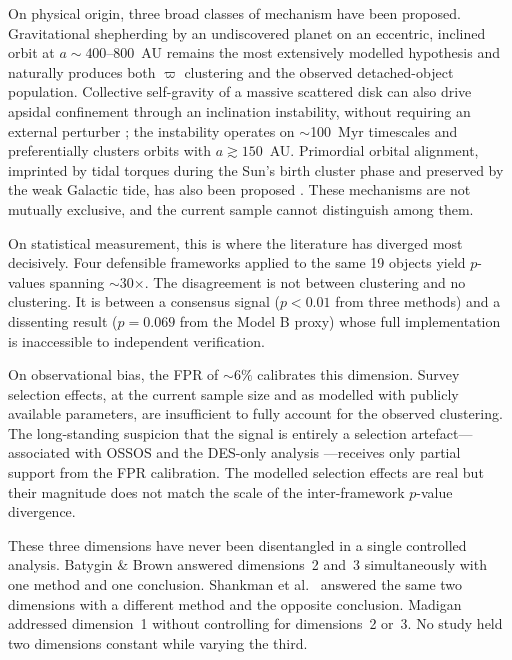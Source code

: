 \documentclass[usenatbib]{mnras}
\begin{document}
On physical origin, three broad classes of mechanism have been proposed. Gravitational shepherding by an undiscovered planet on an eccentric, inclined orbit at $a\sim400$--800~AU \cite{batygin2016,brown2019,batygin2019,siraj2025} remains the most extensively modelled hypothesis and naturally produces both $\varpi$ clustering and the observed detached-object population. Collective self-gravity of a massive scattered disk can also drive apsidal confinement through an inclination instability, without requiring an external perturber \cite{madigan2018,zderic2020}; the instability operates on $\sim$100~Myr timescales and preferentially clusters orbits with $a\gtrsim150$~AU. Primordial orbital alignment, imprinted by tidal torques during the Sun's birth cluster phase and preserved by the weak Galactic tide, has also been proposed \cite{trujillo2014}. These mechanisms are not mutually exclusive, and the current sample cannot distinguish among them.

On statistical measurement, this is where the literature has diverged most decisively. Four defensible frameworks applied to the same 19 objects yield $p$-values spanning $\sim$30$\times$. The disagreement is not between clustering and no clustering. It is between a consensus signal ($p<0.01$ from three methods) and a dissenting result ($p=0.069$ from the Model B proxy) whose full implementation is inaccessible to independent verification.

On observational bias, the FPR of $\sim6\%$ calibrates this dimension. Survey selection effects, at the current sample size and as modelled with publicly available parameters, are insufficient to fully account for the observed clustering. The long-standing suspicion that the signal is entirely a selection artefact---associated with OSSOS \cite{shankman2017} and the DES-only analysis \cite{bernardinelli2020}---receives only partial support from the FPR calibration. The modelled selection effects are real but their magnitude does not match the scale of the inter-framework $p$-value divergence.

These three dimensions have never been disentangled in a single controlled analysis. Batygin \& Brown \cite{batygin2016,brown2019} answered dimensions~2 and~3 simultaneously with one method and one conclusion. Shankman et al.\ \cite{shankman2017} answered the same two dimensions with a different method and the opposite conclusion. Madigan \cite{madigan2018} addressed dimension~1 without controlling for dimensions~2 or~3. No study held two dimensions constant while varying the third.
\end{document}
